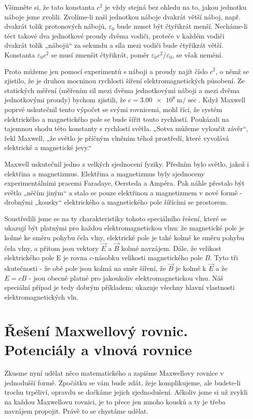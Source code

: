   Všimněte si, že tato konstanta \(c^2\) je vždy stejná bez ohledu na to, jakou jednotku náboje 
  jsme zvolili. Zvolíme-li naší jednotkou náboje dvakrát větší náboj, např. dvakrát tolik 
  protonových nábojů, \(\varepsilon_0\) bude muset být čtyřikrát menší. Necháme-li téct takové dva 
  jednotkové proudy dvěma vodiči, proteče v každém vodiči dvakrát tolik „nábojů“ za sekundu a síla 
  mezi vodiči bude čtyřikrát větší. Konstanta \(\varepsilon_0c^2\) se musí zmenšit čtyřikrát, poměr 
  \(\varepsilon_0c^2/\varepsilon_0\), se však nemění. 
 
  Proto můžeme jen pomocí experimentů s náboji a proudy najít číslo \(c^2\), o němž se zjistilo, že 
  je druhou mocninou rychlosti šíření elektromagnetických působení. Ze statických měření (měřením 
  sil mezi dvěma jednotkovými náboji a mezi dvěma jednotkovými proudy) bychom zjistili, že 
  \(c=\SI{3.00e8}{\m/\sec}\). Když Maxwell poprvé uskutečnil tento výpočet se svými rovnicemi, mohl 
  říci, že systém elektrického a magnetického pole se bude šířit touto rychlostí. Poukázali na 
  tajemnou shodu této konstanty s rychlostí světla. „Sotva můžeme vyloučit závěr“, řekl Maxwell, 
  „že světlo je příčným vlněním téhož prostředí, které vyvolává elektrické a magnetické jevy.“ 
 
  Maxwell uskutečnil jedno z velkých sjednocení fyziky. Předním bylo světlo, jakož i elektřina a 
  magnetizmus. Elektřina a magnetizmus byly sjednoceny experimentálními pracemi Faradaye, Oersteda 
  a Ampéra. Pak náhle přestalo být světlo „něčím jiným“ a stalo se pouze elektřinou a magnetizmem v 
  nové formě - drobnými „kousky“ elektrického a magnetického pole šířícími se prostorem. 
 
  Soustředili jsme se na ty charakteristiky tohoto speciálního řešení, které se ukazují být 
  platnými pro každou elektromagnetickou vlnu: že magnetické pole je kolmé ke směru pohybu čela 
  vlny, elektrické pole je také kolmé ke směru pohybu čela vlny, a přitom jsou vektory \(\vec{E}\) 
  a \(\vec{B}\) kolmé navzájem. Dále, že velikost elektrického pole E je rovna \(c\)-násobku 
  velikosti magnetického pole \(B\).  Tyto tři skutečnosti - že obě pole jsou kolmá na směr šíření, 
  že \(\vec{B}\) je kolmé k \(\vec{E}\) a že \(E= cB\) - jsou obecně platné pro jakoukoliv 
  elektromagnetickou vlnu. Náš speciální případ je tedy dobrým příkladem; ukazuje všechny hlavní 
  vlastnosti elektromagnetických vln.
 
\section{Řešení Maxwellový rovnic. Potenciály a vlnová rovnice}\label{fyz:IIchapXVIIIsecV}
  Zkusme nyní udělat něco matematického a zapišme Maxwellovy rovnice v jednodušší formě. Zpočátku 
  se vám bude zdát, žeje komplikujeme, ale budete-li trochu trpěliví, opravdu se dočkáme jejich 
  zjednodušení. Ačkoliv jsme si už zvykli na každou Maxwellovu rovnici, je to přece jen mnoho 
  kousků a ty je třeba navzájem propojit. Právě to se chystáme udělat.
  
